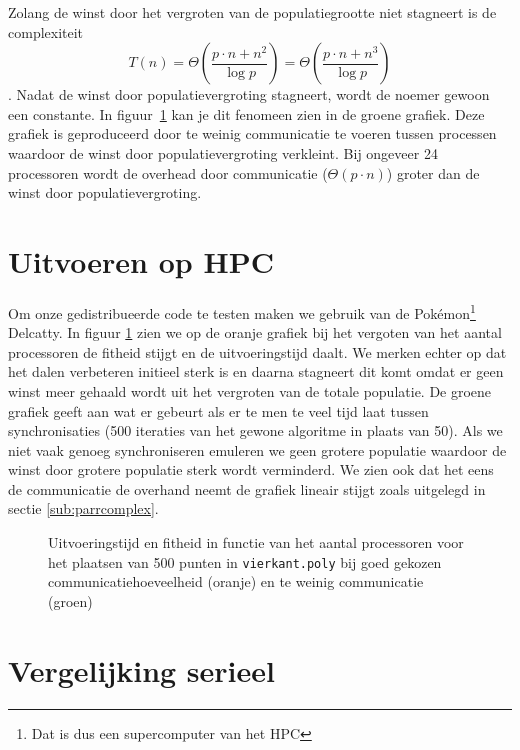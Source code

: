 Zolang de winst door het vergroten van de populatiegrootte niet stagneert is de complexiteit  \[T(n)=\Theta\left(\frac{p\cdot n + n^2}{\log{p}}\right) = \Theta\left(\frac{p\cdot n + n^3}{\log{p}}\right)\]. Nadat de winst door populatievergroting stagneert, wordt de noemer gewoon een constante. In figuur~\ref{delcaty} kan je dit fenomeen zien in de groene grafiek. Deze grafiek is geproduceerd door te weinig communicatie te voeren tussen processen waardoor de winst door populatievergroting verkleint. Bij ongeveer 24 processoren wordt de overhead door communicatie ($\Theta(p\cdot n)$) groter dan de winst door populatievergroting.

\section{Uitvoeren op HPC}
Om onze gedistribueerde code te testen maken we gebruik van de Pokémon\footnote{Dat is dus een supercomputer van het HPC} Delcatty. In figuur \ref{delcaty} zien we op de oranje grafiek bij het vergoten van het aantal processoren de fitheid stijgt en de uitvoeringstijd daalt. We merken echter op dat het dalen verbeteren initieel sterk is en daarna stagneert dit komt omdat er geen winst meer gehaald wordt uit het vergroten van de totale populatie. De groene grafiek geeft aan wat er gebeurt als er te men te veel tijd laat tussen synchronisaties (500 iteraties van het gewone algoritme in plaats van 50). Als we niet vaak genoeg synchroniseren emuleren we geen grotere populatie waardoor de winst door grotere populatie sterk wordt verminderd. We zien ook dat het eens de communicatie de overhand neemt de grafiek lineair stijgt zoals uitgelegd in sectie \ref{sub:parrcomplex}.

\begin{figure}[H]


\caption{Uitvoeringstijd en fitheid in functie van het aantal processoren voor het plaatsen van 500 punten in \texttt{vierkant.poly} bij goed gekozen communicatiehoeveelheid (oranje) en te weinig communicatie (groen)}
\label{delcaty}
\end{figure}

\section{Vergelijking serieel}

